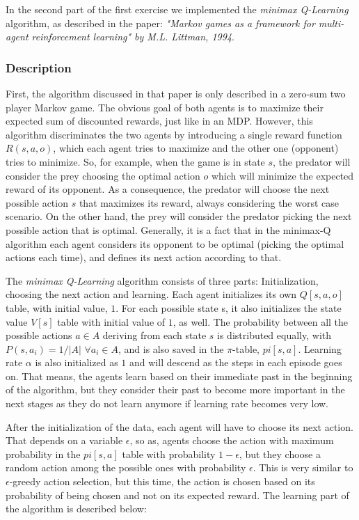 \documentclass[a4paper,11pt]{article}
\begin{document}
In the second part of the first exercise we implemented the \textit{minimax Q-Learning} algorithm, as described in the paper: \textit{"Markov games as a framework for multi-agent reinforcement learning" by M.L. Littman, 1994}.

\subsubsection{Description}
First, the algorithm discussed in that paper is only described in a zero-sum two player Markov game. The obvious goal of both agents is to maximize their expected sum of discounted rewards, just like in an MDP. However, this algorithm discriminates the two agents by introducing a single reward function $R(s,a,o)$, which each agent tries to maximize and the other one (opponent) tries to minimize. So, for example, when the game is in state $s$, the predator will consider the prey choosing the optimal action $o$ which will minimize the expected reward of its opponent. As a consequence, the predator will choose the next possible action $s$ that maximizes its reward, always considering the worst case scenario. On the other hand, the prey will consider the predator picking the next possible action that is optimal. Generally, it is a fact that in the minimax-Q algorithm each agent considers its opponent to be optimal (picking the optimal actions each time), and defines its next action according to that. 

The \textit{minimax Q-Learning} algorithm consists of three parts: 	Initialization, choosing the next action and learning. Each agent initializes its own $Q[s,a,o]$ table, with initial value, $1$. For each possible state s, it also initializes the state value $V[s]$ table with initial value of $1$, as well. The probability between all the possible actions $a \in A$ deriving from each state $s$ is distributed equally, with $P(s,a_{i}) = 1/|A|$ $\forall a_i \in A$, and is also saved in the $\pi$-table, $pi[s,a]$. Learning rate $\alpha$ is also initialized as $1$ and will descend as the steps in each episode goes on. That means, the agents learn based on their immediate past in the beginning of the algorithm, but they consider their past to become more important in the next stages as they do not learn anymore if learning rate becomes very low.

After the initialization of the data, each agent will have to choose its next action. That depends on a variable $\epsilon$, so as, agents choose the action with maximum probability in the $pi[s,a]$ table with probability $1-\epsilon$, but they choose a random action among the possible ones with probability $\epsilon$. This is very similar to $\epsilon$-greedy action selection, but this time, the action is chosen based on its probability of being chosen and not on its expected reward. The learning part of the algorithm is described below:
\end{document}
